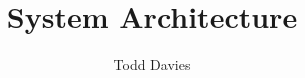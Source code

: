 \newcommand{\coursename}{System Architecture}
\newcommand{\coursecode}{25212}
\newcommand{\courseinfo}{}
\newcommand{\Author}{Todd Davies} 
\newcommand{\Title}{System Architecture}
\author{\Author}
\title{\Title}

